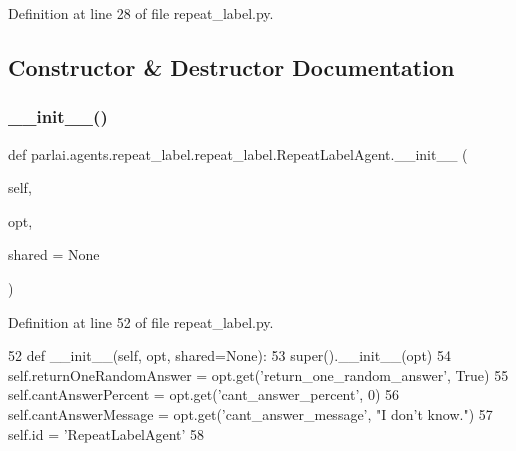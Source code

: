 Definition at line 28 of file repeat\+\_\+label.\+py.



\subsection{Constructor \& Destructor Documentation}
\mbox{\label{classparlai_1_1agents_1_1repeat__label_1_1repeat__label_1_1RepeatLabelAgent_ad2a5f628b5ae8d7a6798ef2646d53111}} 
\subsubsection{\texorpdfstring{\+\_\+\+\_\+init\+\_\+\+\_\+()}{\_\_init\_\_()}}
{\footnotesize\ttfamily def parlai.\+agents.\+repeat\+\_\+label.\+repeat\+\_\+label.\+Repeat\+Label\+Agent.\+\_\+\+\_\+init\+\_\+\+\_\+ (\begin{DoxyParamCaption}\item[{}]{self,  }\item[{}]{opt,  }\item[{}]{shared = {\ttfamily None} }\end{DoxyParamCaption})}



Definition at line 52 of file repeat\+\_\+label.\+py.


\begin{DoxyCode}
52     \textcolor{keyword}{def }\_\_init\_\_(self, opt, shared=None):
53         super().\_\_init\_\_(opt)
54         self.returnOneRandomAnswer = opt.get(\textcolor{stringliteral}{'return\_one\_random\_answer'}, \textcolor{keyword}{True})
55         self.cantAnswerPercent = opt.get(\textcolor{stringliteral}{'cant\_answer\_percent'}, 0)
56         self.cantAnswerMessage = opt.get(\textcolor{stringliteral}{'cant\_answer\_message'}, \textcolor{stringliteral}{"I don't know."})
57         self.id = \textcolor{stringliteral}{'RepeatLabelAgent'}
58 
\end{DoxyCode}


